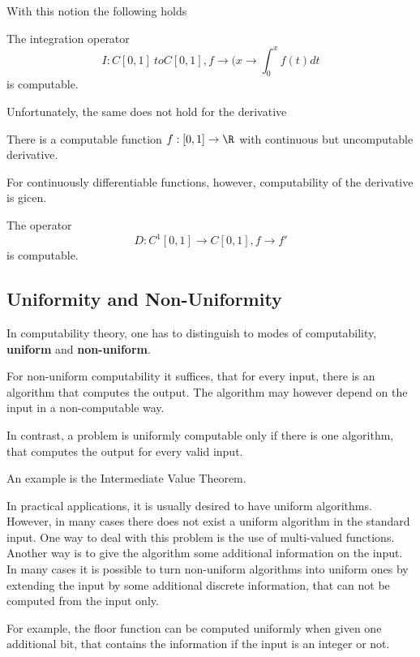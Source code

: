 With this notion the following holds
\begin{theorem}
The integration operator 
$$I: C[0,1] \ to C[0,1], f \to (x \to \int_0^x f(t) dt$$   
is computable.
\end{theorem}
Unfortunately, the same does not hold for the derivative
\begin{theorem}[Myhill 1971]
There is a computable function $f: [0,1] \to \R$ with continuous but uncomputable derivative. 
\end{theorem}
For continuously differentiable functions, however, computability of the
derivative is gicen. 
\begin{theorem}
The operator 
$$ D: C^1[0,1] \to C[0,1], f \to f'$$
is computable.
\end{theorem}
\subsection{Uniformity and Non-Uniformity}
In computability theory, one has to distinguish to modes of computability, \textbf{uniform} and \textbf{non-uniform}.

For non-uniform computability it suffices, that for every input, there is an algorithm that computes the output. 
The algorithm may however depend on the input in a non-computable way.

In contrast, a problem is uniformly computable only if there is one algorithm, that computes the output for every valid input. 

An example is the Intermediate Value Theorem.

In practical applications, it is usually desired to have uniform algorithms.
However, in many cases there does not exist a uniform algorithm in the standard
input.
One way to deal with this problem is the use of multi-valued functions.
Another way is to give the algorithm some additional information on the input.
In many cases it is possible to turn non-uniform algorithms into uniform ones
by extending the input by some additional discrete information, that can not be
computed from the input only.

For example, the floor function can be computed uniformly when given one
additional bit, that contains the information if the input is an integer or
not.  

